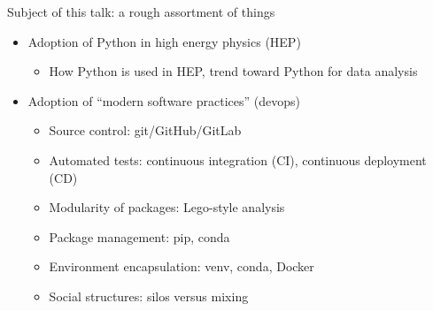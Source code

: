 \documentclass[aspectratio=169]{beamer}
\begin{document}
\begin{frame}{Subject of this talk: a rough assortment of things}
\vspace{0.5 cm}

\begin{itemize}\setlength{\itemsep}{0.5 cm}
\item Adoption of Python in high energy physics (HEP)

\vspace{0.1 cm}
\begin{itemize}\setlength{\itemsep}{0.25 cm}
\item How Python is used in HEP, trend toward Python for data analysis
\end{itemize}

\item Adoption of ``modern software practices'' (devops)

\vspace{0.1 cm}
\begin{itemize}\setlength{\itemsep}{0.25 cm}
\item Source control: git/GitHub/GitLab
\item Automated tests: continuous integration (CI), continuous deployment (CD)
\item Modularity of packages: Lego-style analysis
\item Package management: pip, conda
\item Environment encapsulation: venv, conda, Docker
\item Social structures: silos versus mixing
\end{itemize}

\end{itemize}
\end{frame}
\end{document}
